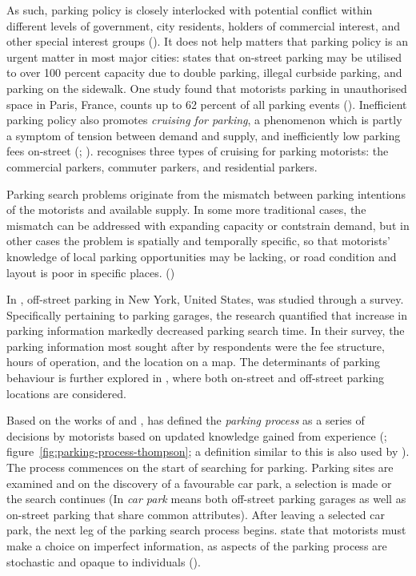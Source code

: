 As such, parking policy is closely interlocked with potential conflict within different levels of government, city residents, holders of commercial interest, and other special interest groups (\cite{Ker1988}). It does not help matters that parking policy is an urgent matter in most major cities: \cite{Arnott2006} states that on-street parking may be utilised to over 100 percent capacity due to double parking, illegal curbside parking, and parking on the sidewalk. One study found that motorists parking in unauthorised space in Paris, France, counts up to 62 percent of all parking events (\cite{Gantelet2006}). Inefficient parking policy also promotes \textit{cruising for parking}, a phenomenon which is partly a symptom of tension between demand and supply, and inefficiently low parking fees on-street (\cite{Shoup2004}; \citeyear{Shoup2006}).  recognises three types of cruising for parking motorists: the commercial parkers, commuter parkers, and residential parkers.

Parking search problems originate from the mismatch between parking intentions of the motorists and available supply. In some more traditional cases, the mismatch can be addressed with expanding capacity or contstrain demand, but in other cases the problem is spatially and temporally specific, so that motorists' knowledge of local parking opportunities may be lacking, or road condition and layout is poor in specific places. (\cite{Axhausen1993})

In , off-street parking in New York, United States, was studied through a survey. Specifically pertaining to parking garages, the research quantified that increase in parking information markedly decreased parking search time. In their survey, the parking information most sought after by respondents were the fee structure, hours of operation, and the location on a map. The determinants of parking behaviour is further explored in , where both on-street and off-street parking locations are considered.

Based on the works of  and , \citeauthor{Thompson1998} has defined the \textit{parking process} as a series of decisions by motorists based on updated knowledge gained from experience (\citeyear{Thompson1998}; figure~\ref{fig:parking-process-thompson}; a definition similar to this is also used by \citeauthor{Guo2013}). The process commences on the start of searching for parking. Parking sites are examined and on the discovery of a favourable car park, a selection is made or the search continues (In  \textit{car park} means both off-street parking garages as well as on-street parking that share common attributes). After leaving a selected car park, the next leg of the parking search process begins. \citeauthor{Thompson1998} state that motorists must make a choice on imperfect information, as aspects of the parking process are stochastic and opaque to individuals (\citeyear{Thompson1998}).

